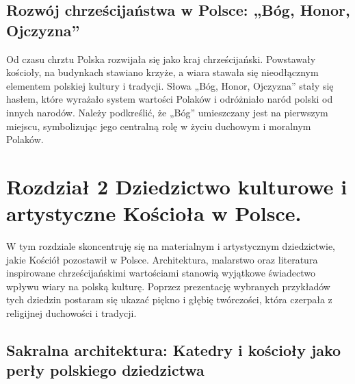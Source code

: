 \subsection{Rozwój chrześcijaństwa w Polsce: „Bóg, Honor, Ojczyzna”}

Od czasu chrztu Polska rozwijała się jako kraj chrześcijański. Powstawały kościoły, na budynkach stawiano krzyże, a wiara stawała się nieodłącznym elementem polskiej kultury i tradycji. Słowa „Bóg, Honor, Ojczyzna” stały się hasłem, które wyrażało system wartości Polaków i odróżniało naród polski od innych narodów. Należy podkreślić, że „Bóg” umieszczany jest na pierwszym miejscu, symbolizując jego centralną rolę w życiu duchowym i moralnym Polaków.

\section{Rozdział 2 Dziedzictwo kulturowe i artystyczne Kościoła w Polsce.}

W tym rozdziale skoncentruję się na materialnym i artystycznym dziedzictwie, jakie Kościół pozostawił w Polsce. Architektura, malarstwo oraz literatura inspirowane chrześcijańskimi wartościami stanowią wyjątkowe świadectwo wpływu wiary na polską kulturę. Poprzez prezentację wybranych przykładów tych dziedzin postaram się ukazać piękno i głębię twórczości, która czerpała z religijnej duchowości i tradycji.

\subsection{Sakralna architektura: Katedry i kościoły jako perły polskiego dziedzictwa}

